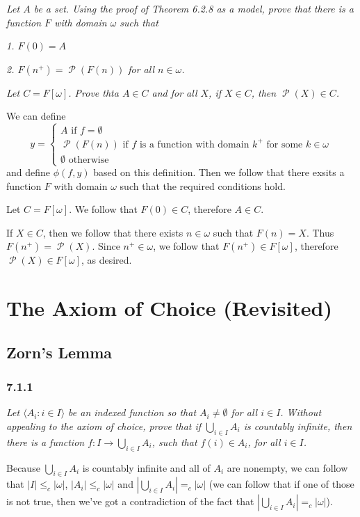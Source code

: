 \documentclass[11pt,oneside,titlepage]{book}
\DeclareMathOperator \pow {\mathcal {P}}
\newcommand{\eangle}[1]{\langle #1 \rangle}
\begin{document}
\textit{Let $A$ be a set. Using the proof of Theorem 6.2.8 as a model, prove that
  there is a function $F$ with domain $\omega$ such that}

\textit{1. $F(0) = A$}

\textit{2. $F(n^+) = \pow(F(n))$ for all $n \in \omega$.}

\textit{Let $C = F[\omega]$. Prove thta $A \in C$ and for all $X$, if $X \in C$,
  then $\pow(X) \in C$.}

We can define
$$y =
\begin{cases}
  A \text{ if } f = \emptyset \\
  \pow(F(n)) \text{ if $f$ is a function with domain $k^+$ for some $k \in \omega$} \\
  \emptyset \text{ otherwise}
\end{cases}
$$
and define $\phi(f, y)$ based on this definition. Then we follow that there exsits
a function $F$ with domain $\omega$ such that the required conditions hold.

Let $C = F[\omega]$. We follow that $F(0) \in C$, therefore $A \in C$.

If $X \in C$, then we follow that there exists $n \in \omega$ such that
$F(n) = X$. Thus $F(n^+) = \pow(X)$. Since $n^+ \in \omega$, we follow that
$F(n^+) \in F[\omega]$, therefore $\pow(X) \in F[\omega]$, as desired.

\chapter{The Axiom of Choice (Revisited)}

\section{Zorn's Lemma}

\subsection*{7.1.1}

\textit{Let $\eangle{A_i: i \in I}$ be an indexed function so that $A_i \neq \emptyset$ for
  all $i \in I$. Without appealing to the axiom of choice, prove that if $\bigcup_{i \in I}{A_i}$
  is countably infinite, then there is a function $f: I \to \bigcup_{i \in I}{A_i}$,
  such that $f(i) \in A_i$, for all $i \in I$.}

Because $\bigcup_{i \in I}{A_i}$ is countably infinite and all of $A_i$ are nonempty,
we can follow that $|I| \leq_c |\omega|$, $|A_i| \leq_c |\omega|$
and $|\bigcup_{i \in I}{A_i}| =_c |\omega|$ (we can follow that if one of those is not true,
then we've got a contradiction of the fact that $|\bigcup_{i \in I}{A_i}| =_c |\omega|$).
\end{document}

